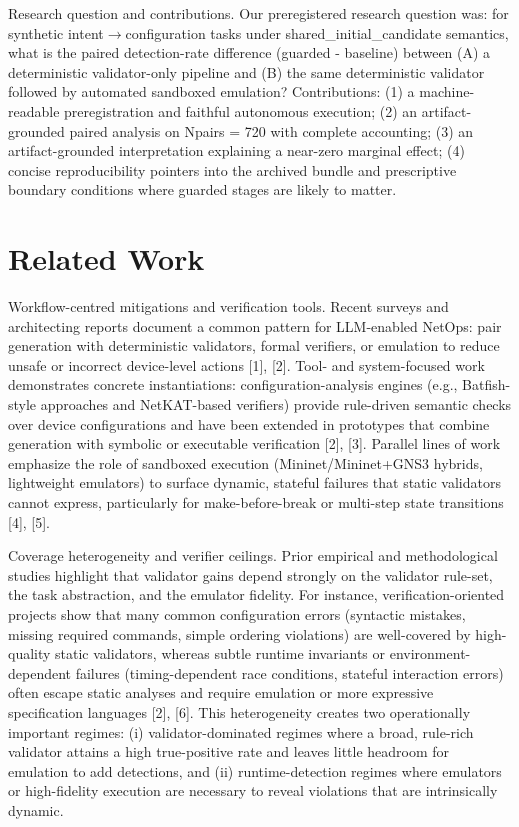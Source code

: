 \documentclass[conference]{IEEEtran}
\begin{document}
Research question and contributions. Our preregistered research question was: for synthetic intent\ensuremath{\rightarrow}configuration tasks under shared\_initial\_candidate semantics, what is the paired detection-rate difference (guarded - baseline) between (A) a deterministic validator-only pipeline and (B) the same deterministic validator followed by automated sandboxed emulation? Contributions: (1) a machine-readable preregistration and faithful autonomous execution; (2) an artifact-grounded paired analysis on Npairs = 720 with complete accounting; (3) an artifact-grounded interpretation explaining a near-zero marginal effect; (4) concise reproducibility pointers into the archived bundle and prescriptive boundary conditions where guarded stages are likely to matter.

\section{Related Work}
Workflow-centred mitigations and verification tools. Recent surveys and architecting reports document a common pattern for LLM-enabled NetOps: pair generation with deterministic validators, formal verifiers, or emulation to reduce unsafe or incorrect device-level actions [1], [2]. Tool- and system-focused work demonstrates concrete instantiations: configuration-analysis engines (e.g., Batfish-style approaches and NetKAT-based verifiers) provide rule-driven semantic checks over device configurations and have been extended in prototypes that combine generation with symbolic or executable verification [2], [3]. Parallel lines of work emphasize the role of sandboxed execution (Mininet/Mininet+GNS3 hybrids, lightweight emulators) to surface dynamic, stateful failures that static validators cannot express, particularly for make-before-break or multi-step state transitions [4], [5].

Coverage heterogeneity and verifier ceilings. Prior empirical and methodological studies highlight that validator gains depend strongly on the validator rule-set, the task abstraction, and the emulator fidelity. For instance, verification-oriented projects show that many common configuration errors (syntactic mistakes, missing required commands, simple ordering violations) are well-covered by high-quality static validators, whereas subtle runtime invariants or environment-dependent failures (timing-dependent race conditions, stateful interaction errors) often escape static analyses and require emulation or more expressive specification languages [2], [6]. This heterogeneity creates two operationally important regimes: (i) validator-dominated regimes where a broad, rule-rich validator attains a high true-positive rate and leaves little headroom for emulation to add detections, and (ii) runtime-detection regimes where emulators or high-fidelity execution are necessary to reveal violations that are intrinsically dynamic.
\end{document}
